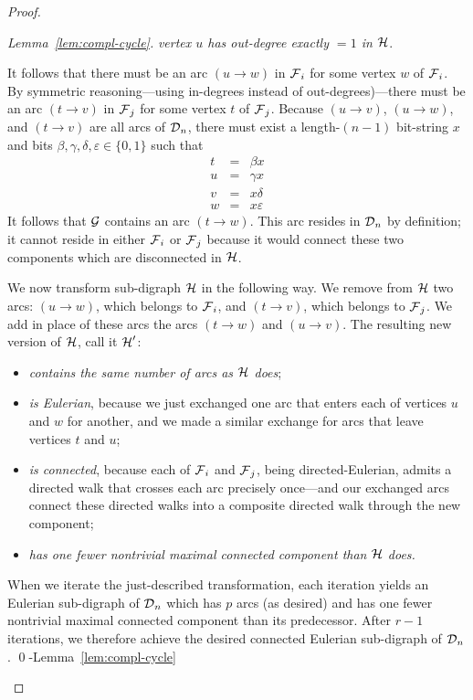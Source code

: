 \begin{proof}
\begin{proof}[Lemma~\ref{lem:compl-cycle}]
\smallskip

{\em vertex $u$ has out-degree {\em exactly} $=1$ in $\mbox{$\cal H$}$}.

\smallskip

\noindent It follows that there must be an arc $(u \rightarrow w)$ in $\mbox{$\cal F$}_i$ for some vertex $w$ of $\mbox{$\cal F$}_i$.  By symmetric reasoning---using in-degrees instead of out-degrees)---there must be an arc  $(t \rightarrow v)$ in $\mbox{$\cal F$}_j$ for some vertex $t$ of $\mbox{$\cal F$}_j$.  Because $(u \rightarrow v)$, $(u \rightarrow w)$, and $(t \rightarrow v)$ are all arcs of $\mbox{$\cal D$}_n$, there must exist a length-$(n-1)$ bit-string $x$ and bits $\beta, \gamma, \delta, \varepsilon \in \{0,1\}$ such that
\begin{eqnarray*}
t & = & \beta x    \\
u & = & \gamma x   \\
v & = & x \delta   \\
w & = & x \varepsilon
\end{eqnarray*}
It follows that $\mbox{$\cal G$}$ contains an arc $(t \rightarrow w)$.  This arc resides in $\mbox{$\cal D$}_n$ by definition; it cannot reside in either $\mbox{$\cal F$}_i$ or $\mbox{$\cal F$}_j$ because it would connect these two components which are disconnected in $\mbox{$\cal H$}$.

\medskip

We now transform sub-digraph $\mbox{$\cal H$}$ in the following way. We remove from $\mbox{$\cal H$}$ two arcs: 
$(u \rightarrow w)$, which belongs to $\mbox{$\cal F$}_i$, and $(t \rightarrow v)$, which belongs to $\mbox{$\cal F$}_j$.  We
add in place of these arcs the arcs $(t \rightarrow w)$ and $(u \rightarrow v)$.  The resulting
new version of $\mbox{$\cal H$}$, call it $\mbox{$\cal H$}'$:
\begin{itemize}
\item
{\em contains the same number of arcs as $\mbox{$\cal H$}$ does};
\medskip\item
{\em is Eulerian}, because we just exchanged one arc that enters each of vertices $u$ and $w$
for another, and we made a similar exchange for arcs that leave vertices $t$ and $u$;
\medskip\item
{\em is connected}, because each of $\mbox{$\cal F$}_i$ and $\mbox{$\cal F$}_j$, being directed-Eulerian, admits a directed walk that crosses each arc precisely once---and our exchanged arcs connect these directed walks into a composite directed walk through the new component;
\medskip\item
{\em has one fewer nontrivial maximal connected component than $\mbox{$\cal H$}$ does.}
\end{itemize}

When we iterate the just-described transformation, each iteration yields an Eulerian sub-digraph of $\mbox{$\cal D$}_n$ which has $p$ arcs (as desired) and has one fewer nontrivial maximal connected component than its predecessor.  After $r-1$ iterations, we therefore achieve the desired connected Eulerian sub-digraph of $\mbox{$\cal D$}_n$.  \qed-Lemma~\ref{lem:compl-cycle}
\end{proof}


\end{proof}
